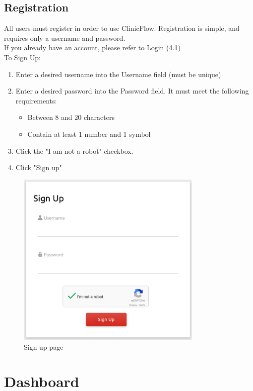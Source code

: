 \documentclass[12pt]{article}
\begin{document}
\subsection{Registration}
All users must register in order to use ClinicFlow. Registration is simple, and requires only a username and password. \\
If you already have an account, please refer to Login (4.1) \\
To Sign Up:
\begin{enumerate}
\item Enter a desired username into the Username field (must be unique)
\item Enter a desired password into the Password field. It must meet the following requirements:
\begin{itemize}
	\item Between 8 and 20 characters
	\item Contain at least 1 number and 1 symbol
\end{itemize}
\item Click the "I am not a robot" checkbox.
\item Click "Sign up"
\end{enumerate}

\begin{figure}[H]
\centering
\includegraphics[width=0.8\textwidth]{signup}
\caption{Sign up page}
\end{figure}

\section{Dashboard}
\end{document}
